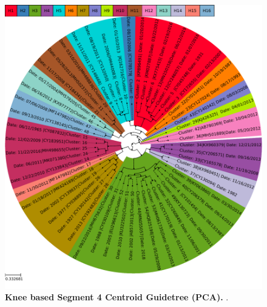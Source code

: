 \blindtext

\begin{figure}[!hbt]
    \includegraphics[width=\dimexpr\textwidth-2\fboxsep-2\fboxrule,fbox]{PCA/Guidetree_segment_4_H_Centroid.pdf}
    \caption[Knee based Segment 4 Centroid Guidetree (\Acrshort{PCA})]{\textbf{Knee based Segment 4 Centroid Guidetree (\Acrshort{PCA}).} .}
    \label{fig:PCA_Guidetree_Centroid_4}
\end{figure}

\blindtext

